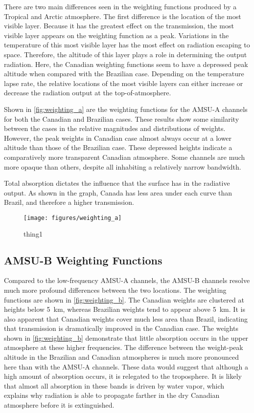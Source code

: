 \documentclass[twocol]{ametsoc}
\begin{document}
There are two main differences seen in the weighting functions produced by a Tropical and Arctic atmosphere.
The first difference is the location of the most visible layer.
Because it has the greatest effect on the transmission, the most visible layer appears on the weighting function as a peak.
Variations in the temperature of this most visible layer has the most effect on radiation escaping to space.
Therefore, the altitude of this layer plays a role in determining the output radiation.
Here, the Canadian weighting functions seem to have a depressed peak altitude when compared with the Brazilian case.
Depending on the temperature lapse rate, the relative locations of the most visible layers can either increase or decrease the radiation output at the top-of-atmosphere.

Shown in \autoref{fig:weighting_a} are the weighting functions for the AMSU-A channels for both the Canadian and Brazilian cases.
These results show some similarity between the cases in the relative magnitudes and distributions of weights.
However, the peak weights in Canadian case almost always occur at a lower altitude than those of the Brazilian case.
These depressed heights indicate a comparatively more transparent Canadian atmosphere.
Some channels are much more opaque than others, despite all inhabiting a relatively narrow bandwidth.

Total absorption dictates the influence that the surface has in the radiative output.
As shown in the graph, Canada has less area under each curve than Brazil, and therefore a higher transmission.

\begin{figure}
	\centering
	\texttt{[image: figures/weighting\_a]}
	\caption{thing1}
	\label{fig:weighting_a}
\end{figure}

\subsection{AMSU-B Weighting Functions}

Compared to the low-frequency AMSU-A channels, the AMSU-B channels resolve much more profound differences between the two locations.
The weighting functions are shown in \autoref{fig:weighting_b}.
The Canadian weights are clustered at heights below 5~km, whereas Brazilian weights tend to appear above 5~km.
It is also apparent that Canadian weights cover much less area than Brazil, indicating that transmission is dramatically improved in the Canadian case.
The weights shown in \autoref{fig:weighting_b} demonstrate that little absorption occurs in the upper atmosphere at these higher frequencies.
The difference between the weight-peak altitude in the Brazilian and Canadian atmospheres is much more pronounced here than with the AMSU-A channels.
These data would suggest that although a high amount of absorption occurs, it is relegated to the troposphere.
It is likely that almost all absorption in these bands is driven by water vapor, which explains why radiation is able to propagate farther in the dry Canadian atmosphere before it is extinguished.
\end{document}

